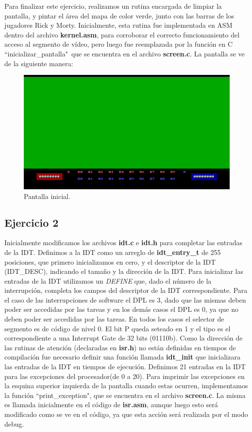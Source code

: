 \documentclass[a4paper]{article}
\begin{document}
\justify
Para finalizar este ejercicio, realizamos un rutina encargada de limpiar la pantalla, y pintar el área del mapa de color verde, junto con las barras de los jugadores Rick y Morty. Inicialmente, esta rutina fue implementada en ASM dentro del archivo \textbf{kernel.asm}, para corroborar el correcto funcionamiento del acceso al segmento de vídeo, pero luego fue reemplazada por la función en C ``inicializar_pantalla"\ que se encuentra en el archivo \textbf{screen.c}. La pantalla se ve de la siguiente manera:

\begin{figure}[h]
	\centering
	\includegraphics[scale=0.6]{img/Pantalla.pdf}
	\caption{Pantalla inicial.}
\end{figure}


\subsection{Ejercicio 2}
\justify
Inicialmente modificamos los archivos \textbf{idt.c} e \textbf{idt.h} para completar las entradas de la IDT. Definimos a la IDT como un arreglo de \textbf{idt_entry_t} de 255 posiciones, que primero inicializamos en cero, y el descriptor de la IDT (IDT_DESC), indicando el tamaño y la dirección de la IDT. Para inicializar las entradas de la IDT utilizamos un \textit{DEFINE} que, dado el número de la interrupción, completa los campos del descriptor de la IDT correspondiente. Para el caso de las interrupciones de software el DPL es 3, dado que las mismas deben poder ser accedidas por las tareas y en los demás casos el DPL es 0, ya que no deben poder ser accedidas por las tareas. En todos los casos el selector de segmento es de código de nivel 0. El bit P queda seteado en 1 y el tipo es el correspondiente a una Interrupt Gate de 32 bits (01110b). Como la dirección de las rutinas de atención (declaradas en \textbf{isr.h}) no están definidas en tiempos de compilación fue necesario definir una función llamada \textbf{idt_init} que inicializara las entradas de la IDT en tiempos de ejecución. Definimos 21 entradas en la IDT para las excepciones del procesador(de 0 a 20).
\justify
Para imprimir las excepciones en la esquina superior izquierda de la pantalla  cuando estas ocurren, implementamos la función ``print_exception", que se encuentra en el archivo \textbf{screen.c}. La misma es llamada inicialmente en el código de \textbf{isr.asm}, aunque luego esto será modificado como se ve en el código, ya que esta acción será realizada por el modo debug. 
\end{document}
